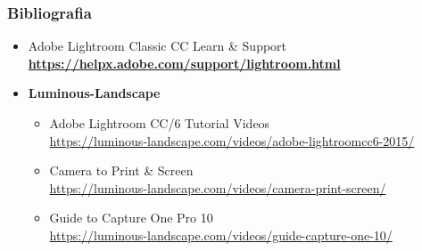 \begin{frame}
    \frametitle{Bibliografia}
    \begin{itemize}[]
      \item Adobe Lightroom Classic CC Learn \& Support\\
      \textbf{\small \url{https://helpx.adobe.com/support/lightroom.html}}

      \item \textbf{Luminous-Landscape} \begin{itemize}
          \item Adobe Lightroom CC/6 Tutorial Videos\\
              {\footnotesize \url{https://luminous-landscape.com/videos/adobe-lightroomcc6-2015/}}
          \item Camera to Print \& Screen\\
              {\footnotesize \url{https://luminous-landscape.com/videos/camera-print-screen/}}
          \item Guide to Capture One Pro 10\\
              {\footnotesize \url{https://luminous-landscape.com/videos/guide-capture-one-10/}}
      \end{itemize}
    \end{itemize}
\end{frame}


